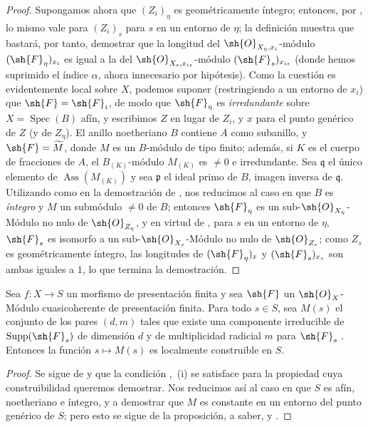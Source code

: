 \begin{proof}
Supongamos ahora que $(Z_i)_\eta$ es geométricamente íntegro; entonces, por , lo mismo vale para $(Z_i)_s$ para $s$ en un entorno de $\eta$; la definición  muestra que bastará, por tanto, demostrar que la longitud del $\sh{O}_{X_\eta,x_i}$-módulo $(\sh{F}_\eta)_{x_i}$ es igual a la del $\sh{O}_{X_s,x_{is}}$-módulo $(\sh{F}_s)_{x_{is}}$ (donde hemos suprimido el índice $\alpha$, ahora innecesario por hipótesis).
Como la cuestión es evidentemente local sobre $X$, podemos suponer (restringiendo a un entorno de $x_i$) que $\sh{F}=\sh{F}_i$, de modo que $\sh{F}_\eta$ es \emph{irredundante} sobre $X=\operatorname{Spec}(B)$ afín, y escribimos $Z$ en lugar de $Z_i$, y $x$ para el punto genérico de $Z$ (y de $Z_\eta$).
El anillo noetheriano $B$ contiene $A$ como subanillo, y $\sh{F}=\widetilde{M}$, donde $M$ es un $B$-módulo de tipo finito; además, si $K$ es el cuerpo de fracciones de $A$, el $B_{(K)}$-módulo $M_{(K)}$ es $\neq 0$ e irredundante.
Sea $\mathfrak{q}$ el único elemento de $\operatorname{Ass}(M_{(K)})$ y sea $\mathfrak{p}$ el ideal primo de $B$, imagen inversa de $\mathfrak q$.
Utilizando  como en la demostración de , nos reducimos al caso en que $B$ es \emph{íntegro} y $M$ un submódulo $\neq 0$ de $B$; entonces $\sh{F}_\eta$ es un sub-$\sh{O}_{X_\eta}$-Módulo no nulo de $\sh{O}_{Z_\eta}$, y en virtud de , para $s$ en un entorno de $\eta$, $\sh{F}_s$ es isomorfo a un sub-$\sh{O}_{X_s}$-Módulo no nulo de $\sh{O}_{Z_s}$; como $Z_s$ es geométricamente íntegro, las longitudes de $(\sh{F}_\eta)_x$ y $(\sh{F}_s)_{x_s}$ son ambas iguales a $1$, lo que termina la demostración.
\end{proof}

\begin{corollary}[9.8.7]
\label{IV.9.8.7}
Sea $f:X\to S$ un morfismo de presentación finita y sea $\sh{F}$ un $\sh{O}_X$-Módulo cuasicoherente de presentación finita.
Para todo $s\in S$, sea $M(s)$ el conjunto de los pares $(d,m)$ tales que existe una componente irreducible de $\operatorname{Supp}(\sh{F}_s)$ de dimensión $d$ y de multiplicidad radicial $m$ para $\sh{F}_s$ .
Entonces la función $s\mapsto M(s)$ es localmente construible en $S$.
\end{corollary}

\begin{proof}
\label{IV.9.8.7-proof}
Se sigue de  y  que la condición ,~(i) se satisface para la propiedad cuya construibilidad queremos demostrar.
Nos reducimos así al caso en que $S$ es afín, noetheriano e íntegro, y a demostrar que $M$ es constante en un entorno del punto genérico de $S$; pero esto se sigue de la proposición, a saber,  y .
\end{proof}

